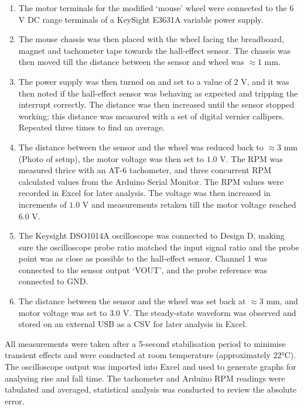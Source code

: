 \begin{enumerate}
    \item The motor terminals \cite{mfa_motor} for the modified `mouse' wheel were connected to the \(6\) V DC range terminals of a KeySight E3631A variable power supply.
    \item The mouse chassis was then placed with the wheel facing the breadboard, magnet and tachometer tape towards the hall-effect sensor. The chassis was then moved till the distance between the sensor and wheel was \(\approx 1\) mm.
    \item The power supply was then turned on and set to a value of \(2\) V, and it was then noted if the hall-effect sensor was behaving as expected and tripping the interrupt correctly. The distance was then increased until the sensor stopped working; this distance was measured with a set of digital vernier callipers. Repeated three times to find an average.
    \item The distance between the sensor and the wheel was reduced back to \(\approx3\) mm (Photo of setup), the motor voltage was then set to \(1.0\) V. The RPM was measured thrice with an AT-6 tachometer, and three concurrent RPM calculated values from the Arduino Serial Monitor. The RPM values were recorded in Excel for later analysis. The voltage was then increased in increments of \(1.0\) V and measurements retaken till the motor voltage reached \(6.0\) V.
    \item The Keysight DSO1014A oscilloscope was connected to Design D, making sure the oscilloscope probe ratio matched the input signal ratio and the probe point was as close as possible to the hall-effect sensor. Channel 1 was connected to the sensor output `VOUT', and the probe reference was connected to GND.
    \item The distance between the sensor and the wheel was set back at \(\approx3\) mm, and motor voltage was set to \(3.0\) V. The steady-state waveform was observed and stored on an external USB as a CSV for later analysis in Excel.
\end{enumerate}

All measurements were taken after a 5-second stabilisation period to minimise transient effects and were conducted at room temperature (approximately 22°C). The oscilloscope output was imported into Excel and used to generate graphs for analysing rise and fall time. The tachometer and Arduino RPM readings were tabulated and averaged, statistical analysis was conducted to review the absolute error.

